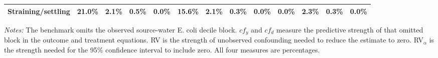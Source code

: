 \begin{landscape}
\begin{table}[p]
\begin{adjustbox}{max width=\linewidth, center}
\begin{tabular}{lcccccccccccc}
\qquad Straining/settling & 21.0\% & 2.1\% & 0.5\% & 0.0\% & 15.6\% & 2.1\% & 0.3\% & 0.0\% & 0.0\% & 2.3\% & 0.3\% & 0.0\% \\
\bottomrule
\end{tabular}
\end{adjustbox}
\par\vspace{3pt}
\begin{minipage}{\linewidth}\footnotesize \textit{Notes:} The benchmark omits the observed source-water E. coli decile block. $cf_y$ and $cf_d$ measure the predictive strength of that omitted block in the outcome and treatment equations. RV is the strength of unobserved confounding needed to reduce the estimate to zero. RV$_\alpha$ is the strength needed for the 95\% confidence interval to include zero. All four measures are percentages.\end{minipage}
\end{table}
\end{landscape}